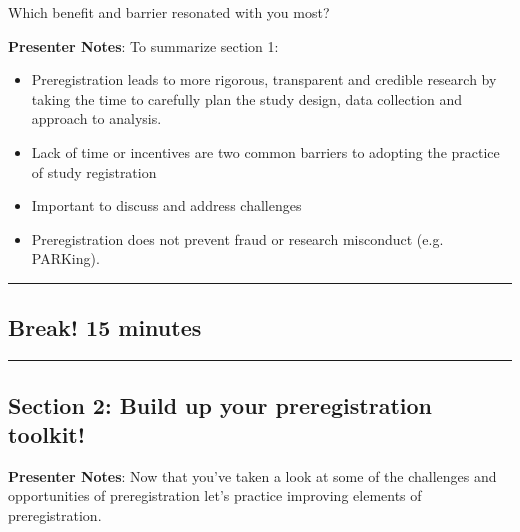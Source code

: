 \documentclass[
  letterpaper,
  DIV=11,
  numbers=noendperiod]{scrartcl}
\begin{document}
\begin{tcolorbox}[enhanced jigsaw, arc=.35mm, bottomrule=.15mm, bottomtitle=1mm, breakable, colback=white, colbacktitle=quarto-callout-note-color!10!white, colframe=quarto-callout-note-color-frame, coltitle=black, left=2mm, leftrule=.75mm, opacityback=0, opacitybacktitle=0.6, rightrule=.15mm, title=\textcolor{quarto-callout-note-color}{\faInfo}\hspace{0.5em}{Reflection point}, titlerule=0mm, toprule=.15mm, toptitle=1mm]

Which benefit and barrier resonated with you most?

\end{tcolorbox}

\textbf{Presenter Notes}: To summarize section 1:

\begin{itemize}
\item
  Preregistration leads to more rigorous, transparent and credible
  research by taking the time to carefully plan the study design, data
  collection and approach to analysis.
\item
  Lack of time or incentives are two common barriers to adopting the
  practice of study registration
\item
  Important to discuss and address challenges
\item
  Preregistration does not prevent fraud or research misconduct (e.g.
  PARKing).
\end{itemize}

\begin{center}\rule{0.5\linewidth}{0.5pt}\end{center}

\subsection{Break! 15 minutes}\label{break-15-minutes}

\begin{center}\rule{0.5\linewidth}{0.5pt}\end{center}

\subsection{Section 2: Build up your preregistration
toolkit!}\label{section-2-build-up-your-preregistration-toolkit}

\textbf{Presenter Notes}: Now that you've taken a look at some of the
challenges and opportunities of preregistration let's practice improving
elements of preregistration.
\end{document}
